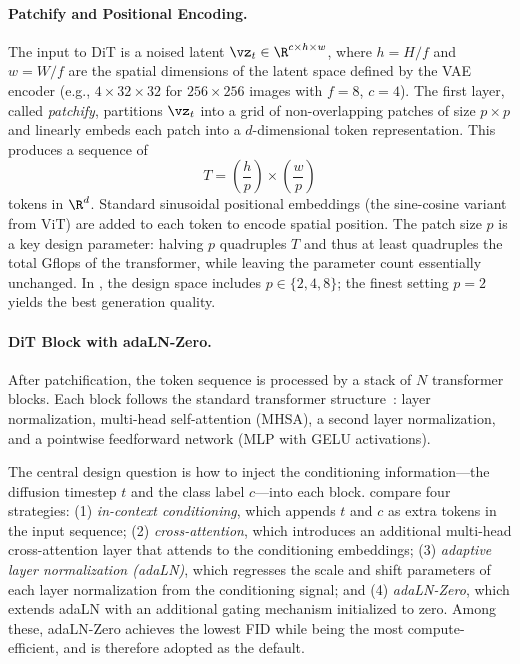 \documentclass[../../book-main.tex]{subfiles}
\begin{document}
\paragraph{Patchify and Positional Encoding.}
The input to DiT is a noised latent \(\vz_t \in \R^{c \times h \times w}\), where \(h = H/f\) and \(w = W/f\) are the spatial dimensions of the latent space defined by the VAE encoder (e.g., \(4 \times 32 \times 32\) for \(256 \times 256\) images with \(f = 8\), \(c = 4\)).
The first layer, called \textit{patchify}, partitions \(\vz_t\) into a grid of non-overlapping patches of size \(p \times p\) and linearly embeds each patch into a \(d\)-dimensional token representation.
This produces a sequence of
\begin{equation}
    T = \left(\frac{h}{p}\right) \times \left(\frac{w}{p}\right)
\end{equation}
tokens in \(\R^d\).
Standard sinusoidal positional embeddings (the sine-cosine variant from ViT) are added to each token to encode spatial position.
The patch size \(p\) is a key design parameter: halving \(p\) quadruples \(T\) and thus at least quadruples the total Gflops of the transformer, while leaving the parameter count essentially unchanged.
In \citet{peebles2023scalable}, the design space includes \(p \in \{2, 4, 8\}\);
the finest setting \(p = 2\) yields the best generation quality.

\paragraph{DiT Block with adaLN-Zero.}
After patchification, the token sequence is processed by a stack of \(N\) transformer blocks.
Each block follows the standard transformer structure~\citep{vaswani2017attention}: layer normalization, multi-head self-attention (MHSA), a second layer normalization, and a pointwise feedforward network (MLP with GELU activations).

The central design question is how to inject the conditioning information---the diffusion timestep \(t\) and the class label \(c\)---into each block.
\citet{peebles2023scalable} compare four strategies: (1) \textit{in-context conditioning}, which appends \(t\) and \(c\) as extra tokens in the input sequence;
(2) \textit{cross-attention}, which introduces an additional multi-head cross-attention layer that attends to the conditioning embeddings;
(3) \textit{adaptive layer normalization (adaLN)}, which regresses the scale and shift parameters of each layer normalization from the conditioning signal;
and (4) \textit{adaLN-Zero}, which extends adaLN with an additional gating mechanism initialized to zero.
Among these, adaLN-Zero achieves the lowest FID while being the most compute-efficient, and is therefore adopted as the default.
\end{document}
